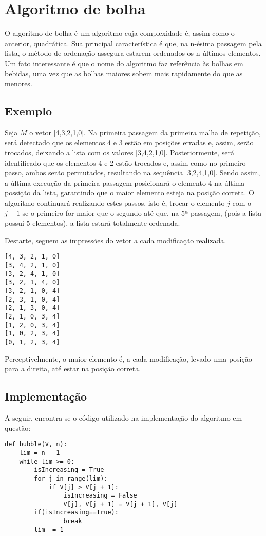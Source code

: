\section{Algoritmo de bolha}
O algoritmo de bolha é um algoritmo cuja complexidade é, assim como o anterior, quadrática. Sua principal característica é que, na n-ésima passagem pela lista, o método de ordenação assegura estarem ordenados os n últimos elementos.
Um fato interessante é que o nome do algoritmo faz referência às bolhas em bebidas, uma vez que as bolhas maiores sobem mais rapidamente do que as menores.


\subsection{Exemplo}
Seja $M$ o vetor [4,3,2,1,0].
Na primeira passagem da primeira malha de repetição, será detectado que os elementos 4 e 3 estão em posições erradas e, assim, serão trocados, deixando a lista com os valores [3,4,2,1,0]. Posteriormente, será identificado que os elementos 4 e 2 estão trocados e, assim como no primeiro passo, ambos serão permutados, resultando na sequência [3,2,4,1,0]. Sendo assim, a última execução da primeira passagem posicionará o elemento 4 na última possição da lista, garantindo que o maior elemento esteja na posição correta.
O algoritmo continuará realizando estes passos, isto é, trocar o elemento $j$ com o $j+1$ se o primeiro for maior que o segundo até que, na 5ª passagem, (pois a lista possui 5 elementos), a lista estará totalmente ordenada.

Destarte, seguem as impressões do vetor a cada modificação realizada. 

\begin{lstlisting}
[4, 3, 2, 1, 0]
[3, 4, 2, 1, 0]
[3, 2, 4, 1, 0]
[3, 2, 1, 4, 0]
[3, 2, 1, 0, 4]
[2, 3, 1, 0, 4]
[2, 1, 3, 0, 4]
[2, 1, 0, 3, 4]
[1, 2, 0, 3, 4]
[1, 0, 2, 3, 4]
[0, 1, 2, 3, 4]
\end{lstlisting}

Perceptivelmente, o maior elemento é, a cada modificação, levado uma posição para a direita, até estar na posição correta. 
\newpage
\subsection{Implementação}
A seguir, encontra-se o código utilizado na implementação do algoritmo em questão:

\begin{lstlisting}
def bubble(V, n):
    lim = n - 1
    while lim >= 0:
        isIncreasing = True
        for j in range(lim):
            if V[j] > V[j + 1]:
                isIncreasing = False
                V[j], V[j + 1] = V[j + 1], V[j]
        if(isIncreasing==True): 
                break
        lim -= 1
\end{lstlisting}


